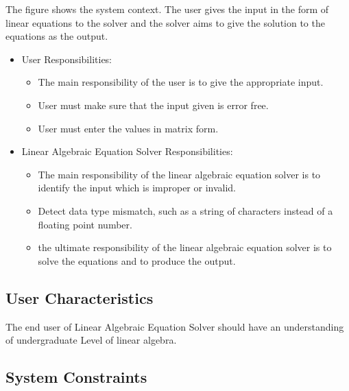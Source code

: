 \documentclass[12pt]{article}
\newcommand{\progname}{Linear Algebraic Equation Solver} %
\begin{document}
The figure shows the system context. The user gives the input in the form of
linear equations to the solver and the solver aims to give the solution to the
equations as the output.


\begin{itemize}
\item User Responsibilities:
\begin{itemize}
\item The main responsibility of the user is to give the appropriate input.
\item User must make sure that the input given is error free.
\item User must enter the values in matrix form. 
\end{itemize}
\item \progname{} Responsibilities:
\begin{itemize}
\item The main responsibility of the linear algebraic equation solver is to
  identify the input which is improper or invalid. 
\item Detect data type mismatch, such as a string of characters instead of a
  floating point number.
\item the ultimate responsibility of the linear algebraic equation solver is to
solve the equations and to produce the output.
\end{itemize}
\end{itemize}

\subsection{User Characteristics} \label{SecUserCharacteristics}

The end user of \progname{} should have an understanding of undergraduate Level
of linear algebra.  

\subsection{System Constraints}
\end{document}
